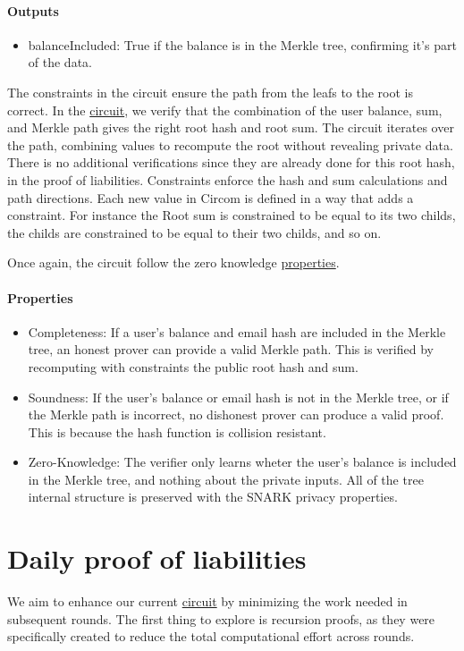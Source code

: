 \paragraph{Outputs}
\begin{itemize}
   \item balanceIncluded: True if the balance is in the Merkle tree, confirming it's part of the data.
   \end{itemize}



The constraints in the circuit ensure the path from the leafs to the root is correct. 
In the \hyperref[subsec:pic]{circuit}, we verify that the combination of the user balance, sum, and Merkle path gives the right root hash and root sum. 
The circuit iterates over the path, combining values to recompute the root without revealing private data. 
There is no additional verifications since they are already done for this root hash, in the proof of liabilities. 
Constraints enforce the hash and sum calculations and path directions. 
Each new value in Circom is defined in a way that adds a constraint. For instance the Root sum is constrained to be equal to its two childs, the childs are constrained to be equal to their two childs, and so on.

Once again, the circuit follow the zero knowledge \hyperref[subsec:zkp]{properties}. 
\paragraph{Properties}
\begin{itemize}
   \item Completeness: If a user's balance and email hash are included in the Merkle tree, an honest prover can provide a valid Merkle path. This is verified by recomputing with constraints the public root hash and sum.
   \item Soundness: If the user's balance or email hash is not in the Merkle tree, or if the Merkle path is incorrect, no dishonest prover can produce a valid proof. This is because the hash function is collision resistant.
   \item Zero-Knowledge: The verifier only learns wheter the user's balance is included in the Merkle tree, and nothing about the private inputs. All of the tree internal structure is preserved with the SNARK privacy properties.
   \end{itemize}

\section{Daily proof of liabilities}
We aim to enhance our current \hyperref[subsec:pl]{circuit} by minimizing the work needed in subsequent rounds.
The first thing to explore is recursion proofs, as they were specifically created to reduce the total computational effort across rounds.

